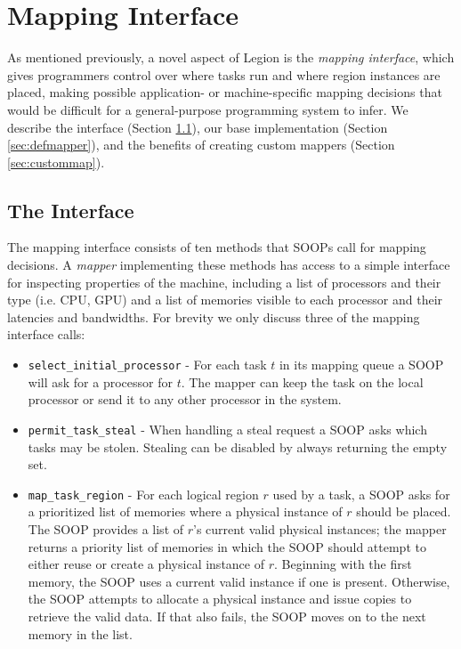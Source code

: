 \section{Mapping Interface}
\label{sec:mapping}

As mentioned previously, a novel aspect of Legion is the {\em mapping interface},
which gives programmers control over where tasks run and where region instances are placed,
making possible application- or machine-specific mapping decisions that would be difficult for a 
general-purpose programming system to infer.
We describe the interface (Section \ref{sec:mapinterface}),
our base implementation (Section \ref{sec:defmapper}), and the benefits
of creating custom mappers (Section \ref{sec:custommap}).

\subsection{The Interface}
\label{sec:mapinterface}

The mapping interface consists of ten methods that SOOPs call for
mapping decisions.  A {\em mapper} implementing these methods has access to a simple interface
for inspecting properties of the machine, including a list of
processors and their type (i.e. CPU, GPU) and a list of
memories visible to each processor and their latencies and bandwidths.
For brevity we only discuss three of the mapping interface calls:

\begin{itemize}
\item {\tt select\_initial\_processor} - For each task $t$ in its mapping queue a SOOP will
ask for a processor for $t$.  The mapper can keep the task on the local processor or send it to 
any other processor in the system.

\item {\tt permit\_task\_steal} - When handling a steal request a SOOP
asks which tasks may be stolen.  Stealing can be disabled by always returning the empty set.

\item {\tt map\_task\_region} - For each logical region $r$ used by a task, a
SOOP asks for a prioritized list of memories where a physical instance of $r$ should be placed.  
The SOOP provides a list of $r$'s current valid physical instances;
the mapper returns a priority list of memories in which the SOOP
should attempt to either reuse or create a physical instance of $r$.  Beginning with
the first memory, the SOOP uses a current valid instance if one is present.  Otherwise,
the SOOP attempts to allocate a physical instance and issue copies
to retrieve the valid data.  If that also fails, the SOOP moves on to the next memory in the list.
\end{itemize}

